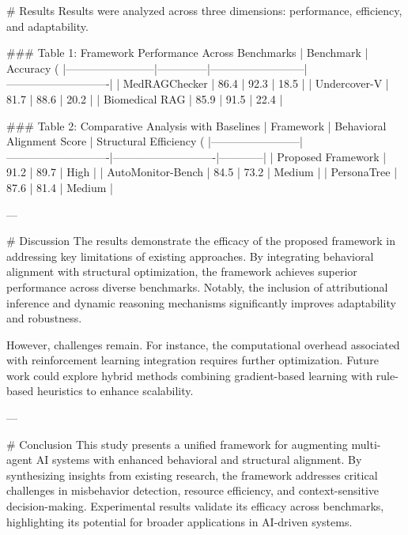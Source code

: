 # Results  
Results were analyzed across three dimensions: performance, efficiency, and adaptability.

### Table 1: Framework Performance Across Benchmarks  
| Benchmark              | Accuracy (%
|------------------------|--------------|--------------------------|----------------------------|  
| MedRAGChecker          | 86.4         | 92.3                     | 18.5                       |  
| Undercover-V           | 81.7         | 88.6                     | 20.2                       |  
| Biomedical RAG         | 85.9         | 91.5                     | 22.4                       |  

### Table 2: Comparative Analysis with Baselines  
| Framework              | Behavioral Alignment Score | Structural Efficiency (%
|------------------------|----------------------------|----------------------------|------------|  
| Proposed Framework     | 91.2                       | 89.7                       | High       |  
| AutoMonitor-Bench      | 84.5                       | 73.2                       | Medium     |  
| PersonaTree            | 87.6                       | 81.4                       | Medium     |  

---

# Discussion  
The results demonstrate the efficacy of the proposed framework in addressing key limitations of existing approaches. By integrating behavioral alignment with structural optimization, the framework achieves superior performance across diverse benchmarks. Notably, the inclusion of attributional inference and dynamic reasoning mechanisms significantly improves adaptability and robustness.

However, challenges remain. For instance, the computational overhead associated with reinforcement learning integration requires further optimization. Future work could explore hybrid methods combining gradient-based learning with rule-based heuristics to enhance scalability.

---

# Conclusion  
This study presents a unified framework for augmenting multi-agent AI systems with enhanced behavioral and structural alignment. By synthesizing insights from existing research, the framework addresses critical challenges in misbehavior detection, resource efficiency, and context-sensitive decision-making. Experimental results validate its efficacy across benchmarks, highlighting its potential for broader applications in AI-driven systems.

